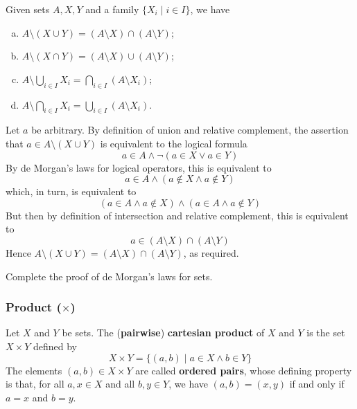 \begin{theorem}
\label{thmDeMorganForSets}
Given sets $A,X,Y$ and a family $\{ X_i \mid i \in I \}$, we have
\begin{enumerate}[(a)] 
\item $A \setminus (X \cup Y) = (A \setminus X) \cap (A \setminus Y)$;
\item $A \setminus (X \cap Y) = (A \setminus X) \cup (A \setminus Y)$;
\item $\displaystyle A \setminus \bigcup_{i \in I} X_i = \bigcap_{i \in I} (A \setminus X_i)$;
\item $\displaystyle A \setminus \bigcap_{i \in I} X_i = \bigcup_{i \in I} (A \setminus X_i)$.
\end{enumerate}
\end{theorem}

\begin{cproof}[of (a)]
Let $a$ be arbitrary. By definition of union and relative complement, the assertion that $a \in A \setminus (X \cup Y)$ is equivalent to the logical formula
\[ a \in A \wedge \neg (a \in X \vee a \in Y) \]
By de Morgan's laws for logical operators, this is equivalent to
\[ a \in A \wedge (a \not\in X \wedge a \not\in Y) \]
which, in turn, is equivalent to
\[ (a \in A \wedge a \not\in X) \wedge (a \in A \wedge a \not\in Y) \]
But then by definition of intersection and relative complement, this is equivalent to
\[ a \in (A \setminus X) \cap (A \setminus Y) \]
Hence $A \setminus (X \cup Y) = (A \setminus X) \cap (A \setminus Y)$, as required.
\end{cproof}

\begin{exercise}
Complete the proof of de Morgan's laws for sets.
\end{exercise}

\subsubsection*{Product ($\times$)}

\begin{definition}
\label{defCartesianProductPairwise}
Let $X$ and $Y$ be sets. The (\textbf{pairwise}) \textbf{cartesian product} of $X$ and $Y$ is the set $X \times Y$  defined by
\[ X \times Y = \{ (a,b) \mid a \in X \wedge b \in Y \} \]
The elements $(a,b) \in X \times Y$ are called \textbf{ordered pairs}, whose defining property is that, for all $a,x \in X$ and all $b,y \in Y$, we have $(a,b) = (x,y)$ if and only if $a=x$ and $b=y$.
\end{definition}

